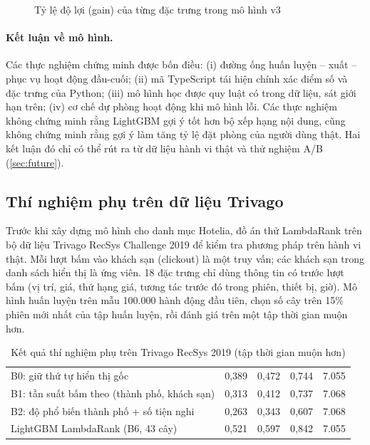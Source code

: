 \begin{figure}[H]
\centering
{}
\caption{Tỷ lệ độ lợi (gain) của từng đặc trưng trong mô hình v3}\label{fig:importance}
\end{figure}

\paragraph{Kết luận về mô hình.} Các thực nghiệm chứng minh được bốn điều: (i) đường ống huấn luyện -- xuất -- phục vụ hoạt động đầu-cuối; (ii) mã TypeScript tái hiện chính xác điểm số và đặc trưng của Python; (iii) mô hình học được quy luật có trong dữ liệu, sát giới hạn trên; (iv) cơ chế dự phòng hoạt động khi mô hình lỗi. Các thực nghiệm không chứng minh rằng LightGBM gợi ý tốt hơn bộ xếp hạng nội dung, cũng không chứng minh rằng gợi ý làm tăng tỷ lệ đặt phòng của người dùng thật. Hai kết luận đó chỉ có thể rút ra từ dữ liệu hành vi thật và thử nghiệm A/B (\cref{sec:future}).

\subsection{Thí nghiệm phụ trên dữ liệu Trivago}\label{sec:trivago}

Trước khi xây dựng mô hình cho danh mục Hotelia, đồ án thử LambdaRank trên bộ dữ liệu Trivago RecSys Challenge 2019 \cite{adamczak2019} để kiểm tra phương pháp trên hành vi thật. Mỗi lượt bấm vào khách sạn (clickout) là một truy vấn; các khách sạn trong danh sách hiển thị là ứng viên. 18 đặc trưng chỉ dùng thông tin có trước lượt bấm (vị trí, giá, thứ hạng giá, tương tác trước đó trong phiên, thiết bị, giờ). Mô hình huấn luyện trên mẫu 100.000 hành động đầu tiên, chọn số cây trên 15\% phiên mới nhất của tập huấn luyện, rồi đánh giá trên một tập thời gian muộn hơn.

\begin{table}[H]
\centering
\caption{Kết quả thí nghiệm phụ trên Trivago RecSys 2019 (tập thời gian muộn hơn)}\label{tab:trivago}
\begin{rtable}
\begin{tabular}{|L{6.8cm}|C{2.0cm}|C{2.0cm}|C{2.0cm}|C{1.8cm}|}
\hline
{} &  &  &  &  \\ \hline
B0: giữ thứ tự hiển thị gốc & 0,389 & 0,472 & 0,744 & 7.055 \\ \hline
B1: tần suất bấm theo (thành phố, khách sạn) & 0,313 & 0,412 & 0,737 & 7.068 \\ \hline
B2: độ phổ biến thành phố + số tiện nghi & 0,263 & 0,343 & 0,607 & 7.068 \\ \hline
LightGBM LambdaRank (B6, 43 cây) & 0,521 & 0,597 & 0,842 & 7.055 \\ \hline
\end{tabular}
\end{rtable}
\end{table}

